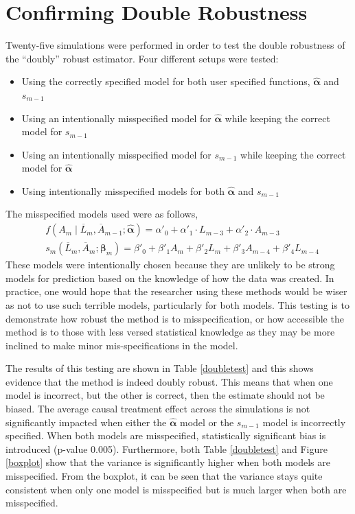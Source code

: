 \newpage
\section{Confirming Double Robustness} \label{doublerobust}
Twenty-five simulations were performed in order to test the double robustness of the ``doubly'' robust estimator.  Four different setups were tested: 
\begin{itemize} 
\item Using the correctly specified model for both user specified functions, $\hat{\mathbf{\alpha}}$ and $s_{m-1}$ 
\item Using an intentionally misspecified model for $\hat{\mathbf{\alpha}}$ while keeping the correct model for $s_{m-1}$ 
\item Using an intentionally misspecified model for $s_{m-1}$ while keeping the correct model for $\hat{\mathbf{\alpha}}$
\item Using intentionally misspecified models for both $\hat{\mathbf{\alpha}}$ and $s_{m-1}$ 
\end{itemize} 

The misspecified models used were as follows, 
\begin{align} 
&f(A_m \mid \overline{L}_m, \overline{A}_{m-1}; \hat{\mathbf{\alpha}}) = \alpha'_{0} + \alpha'_{1} \cdot L_{m-3} + \alpha'_{2} \cdot A_{m-3} \\ 
&s_{m}(\overline{L}_{m}, \overline{A}_{m};\mathbf{\beta}_{m}) = \beta'_0 + \beta'_1 A_{m} +\beta'_2 L_m  +\beta'_3 A_{m-4} +  \beta'_4 L_{m-4} 
 \end{align} 
These models were intentionally chosen because they are unlikely to be strong models for prediction based on the knowledge of how the data was created.  In practice, one would hope that the researcher using these methods would be wiser as not to use such terrible models, particularly for both models.  This testing is to demonstrate how robust the method is to misspecification, or how accessible the method is to those with less versed statistical knowledge as they may be more inclined to make minor mis-specifications in the model.  

The results of this testing are shown in Table \ref{doubletest} and this shows evidence that the method is indeed doubly robust.  This means that when one model is incorrect, but the other is correct, then the estimate should not be biased.  The average causal treatment effect across the simulations is not significantly impacted when either the $\hat{\mathbf{\alpha}}$ model or the $s_{m-1}$ model is incorrectly specified.  When both models are misspecified, statistically significant bias is introduced (p-value 0.005).  Furthermore, both Table \ref{doubletest} and Figure \ref{boxplot} show that the variance is significantly higher when both models are misspecified.  From the boxplot, it can be seen that the variance stays quite consistent when only one model is misspecified but is much larger when both are misspecified.  


